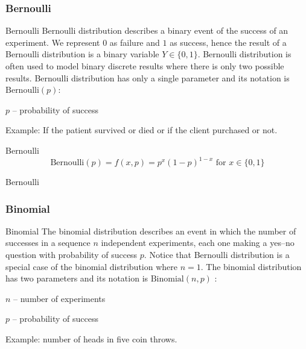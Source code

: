 \subsubsection{Bernoulli}
\begin{frame}{Bernoulli}
	Bernoulli distribution describes a binary event of the success of an experiment.
	We represent $0$ as failure and $1$ as success, hence the result of a
	Bernoulli distribution is a binary variable $Y \in \{0, 1\}$.
	\vfill
	Bernoulli distribution is often used to model binary discrete results
	where there is only two possible results.
	\vfill
	Bernoulli distribution has only a single parameter and its notation is
	$\text{Bernoulli} (p)$:
	\begin{vfilleditems}
		\item $p$ -- probability of success
	\end{vfilleditems}
	\vfill
	Example: If the patient survived or died or if the client purchased or not.
\end{frame}

\begin{frame}{Bernoulli}
	$$\text{Bernoulli}(p) = f(x, p)=p^{x}(1-p)^{1-x} \text{ for $x \in \{0,1\}$}$$ %
\end{frame}

\begin{frame}{Bernoulli}
	\centering
\end{frame}

\subsubsection{Binomial}
\begin{frame}{Binomial}
	The binomial distribution describes an event in which the number of
	successes in a sequence $n$ independent experiments,
	each one making a yes--no question with probability of success $p$.
	Notice that Bernoulli distribution is a special case of the binomial
	distribution where $n=1$.
	\vfill
	The binomial distribution has two parameters and its notation is
	$\text{Binomial}(n, p)$ :
	\begin{vfilleditems}
		\item $n$ -- number of experiments
		\item $p$ -- probability of success
	\end{vfilleditems}
	\vfill
	Example: number of heads in five coin throws.
\end{frame}

